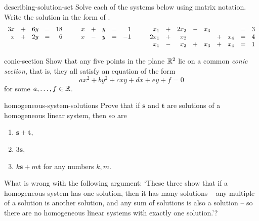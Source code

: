 \begin{exercise}{}{describing-solution-set}
 Solve each of the systems below using matrix notation. Write the solution in
 the form of .
 \[
  \begin{array}[t]{r c r c r}
   3x & + & 6y & = & 18\\
   x & + & 2y & = & 6
  \end{array} \hspace{2em}
  \begin{array}[t]{r c r c r}
   x & + & y & = & 1\\
   x & - & y & = & -1
  \end{array} \hspace{2em}
  \begin{array}[t]{r c r c r c r c r}
   x_1 & + & 2x_2 & - & x_3 & & & = & 3\\
   2x_1 & + & x_2 & & & + & x_4 & = & 4\\
   x_1 & - & x_2 & + & x_3 & + & x_4 & = & 1
  \end{array}
 \]
\end{exercise}

\begin{exercise}{}{conic-section}
 Show that any five points in the plane $\mathbb{R}^2$ lie on a common \emph{conic
 section}, that is, they all satisfy an equation of the form
 \[
  ax^2 + by^2 + cxy + dx + ey + f = 0
 \]
 for some $a,\ldots,f \in \mathbb{R}$.
\end{exercise}

\begin{exercise}{}{homogeneous-system-solutions}
 Prove that if $\mathbf{s}$ and $\mathbf{t}$ are solutions of a homogeneous
 linear system, then so are
 \begin{enumerate}
  \item $\mathbf{s} + \mathbf{t}$,
  \item $3 \mathbf{s}$,
  \item $k \mathbf{s} + m \mathbf{t}$ for any numbers $k,m$.
 \end{enumerate}
 What is wrong with the following argument: `These three show that if a
 homogeneous system has one solution, then it has many solutions -- any multiple
 of a solution is another solution, and any sum of solutions is also a solution
 -- so there are no homogeneous linear systems with exactly one solution.'?
\end{exercise}
